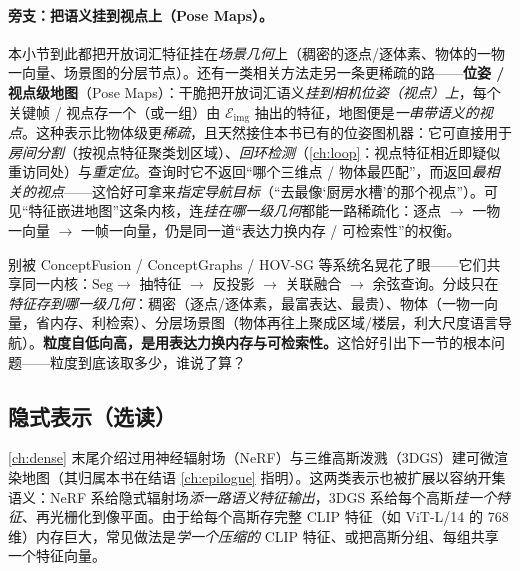 \paragraph{旁支：把语义挂到视点上（Pose Maps）。}
本小节到此都把开放词汇特征挂在\emph{场景几何}上（稠密的逐点/逐体素、物体的一物一向量、场景图的分层节点）。还有一类相关方法走另一条更稀疏的路——\textbf{位姿 / 视点级地图}（Pose Maps）：干脆把开放词汇语义\emph{挂到相机位姿（视点）上}，每个关键帧 / 视点存一个（或一组）由 $\mathcal{E}_{\mathrm{img}}$ 抽出的特征，地图便是\emph{一串带语义的视点}\cite{paull2026openworld}。这种表示比物体级更\emph{稀疏}，且天然接住本书已有的位姿图机器：它可直接用于\emph{房间分割}（按视点特征聚类划区域）、\emph{回环检测}（\cref{ch:loop}：视点特征相近即疑似重访同处）与\emph{重定位}。查询时它不返回“哪个三维点 / 物体最匹配”，而返回\emph{最相关的视点}——这恰好可拿来\emph{指定导航目标}（“去最像‘厨房水槽’的那个视点”）。可见“特征嵌进地图”这条内核，连\emph{挂在哪一级几何}都能一路稀疏化：逐点 $\to$ 一物一向量 $\to$ 一帧一向量，仍是同一道“表达力换内存 / 可检索性”的权衡。

\begin{insight}
别被 ConceptFusion / ConceptGraphs / HOV-SG 等系统名晃花了眼——它们共享同一内核：$\mathrm{Seg}\to$ 抽特征 $\to$ 反投影 $\to$ 关联融合 $\to$ 余弦查询。分歧只在\emph{特征存到哪一级几何}：稠密（逐点/逐体素，最富表达、最贵）、物体（一物一向量，省内存、利检索）、分层场景图（物体再往上聚成区域/楼层，利大尺度语言导航）。\textbf{粒度自低向高，是用表达力换内存与可检索性。}这恰好引出下一节的根本问题——粒度到底该取多少，谁说了算？
\end{insight}

\subsection{隐式表示（选读）}
\label{sec:openworld-implicit}

\cref{ch:dense} 末尾介绍过用神经辐射场（NeRF）与三维高斯泼溅（3DGS）建可微渲染地图（其归属本书在结语 \cref{ch:epilogue} 指明）。这两类表示也被扩展以容纳开集语义：NeRF 系给隐式辐射场\emph{添一路语义特征输出}，3DGS 系给每个高斯\emph{挂一个特征}、再光栅化到像平面\cite{paull2026openworld}。由于给每个高斯存完整 CLIP 特征（如 ViT-L/14 的 $768$ 维）内存巨大，常见做法是\emph{学一个压缩的} CLIP 特征、或把高斯分组、每组共享一个特征向量。

